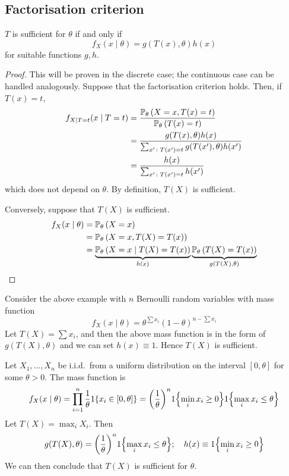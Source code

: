 \subsection{Factorisation criterion}
\begin{theorem}
	\( T \) is sufficient for \( \theta \) if and only if
	\[ f_X(x \mid \theta) = g(T(x), \theta) h(x) \]
	for suitable functions \( g,h \).
\end{theorem}
\begin{proof}
	This will be proven in the discrete case; the continuous case can be handled analogously.
	Suppose that the factorisation criterion holds.
	Then, if \( T(x) = t \),
	\begin{align*}
		f_{X \mid T = t}(x \mid T = t) &= \frac{\mathbb{P}_{\theta}\left({X = x, T(x) = t}\right)}{\mathbb{P}_{\theta}\left({T(x) = t}\right)} \\
		&= \frac{g(T(x),\theta)h(x)}{\sum_{x' \colon T(x') = t} g(T(x'),\theta)h(x')} \\
		&= \frac{h(x)}{\sum_{x' \colon T(x') = t} h(x')}
	\end{align*}
	which does not depend on \( \theta \).
	By definition, \( T(X) \) is sufficient.

	Conversely, suppose that \( T(X) \) is sufficient.
	\begin{align*}
		f_X(x \mid \theta) &= \mathbb{P}_{\theta}\left({X = x}\right) \\
		&= \mathbb{P}_{\theta}\left({X = x, T(X) = T(x)}\right) \\
		&= \underbrace{\mathbb{P}_{\theta}\left({X = x \mid T(X) = T(x)}\right)}_{h(x)} \underbrace{\mathbb{P}_{\theta}\left({T(X) = T(x)}\right)}_{g(T(X), \theta)}
	\end{align*}
\end{proof}
\begin{example}
	Consider the above example with \( n \) Bernoulli random variables with mass function
	\[ f_X(x \mid \theta) = \theta^{\sum x_i} (1-\theta)^{n - \sum x_i} \]
	Let \( T(X) = \sum x_i \), and then the above mass function is in the form of \( g(T(X), \theta) \) and we can set \( h(x) \equiv 1 \).
	Hence \( T(X) \) is sufficient.
\end{example}
\begin{example}
	Let \( X_1, \dots, X_n \) be i.i.d.\ from a uniform distribution on the interval \( [0,\theta] \) for some \( \theta > 0 \).
	The mass function is
	\[ f_X(x \mid \theta) = \prod_{i=1}^n \frac{1}{\theta} 1\qty{x_i \in [0,\theta]} = \qty(\frac{1}{\theta})^{n} 1\qty{\min_i x_i \geq 0} 1\qty{\max_i x_i \leq \theta} \]
	Let \( T(X) = \max_i X_i \).
	Then
	\[ g(T(X), \theta) = \qty(\frac{1}{\theta})^n 1\qty{\max_i x_i \leq \theta};\quad h(x) \equiv 1\qty{\min_i x_i \geq 0} \]
	We can then conclude that \( T(X) \) is sufficient for \( \theta \).
\end{example}

